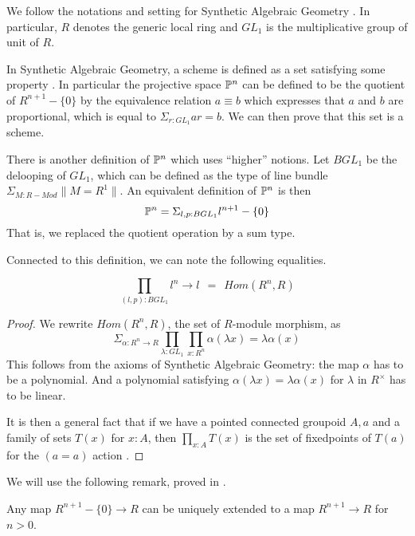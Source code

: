 We follow the notations and setting for Synthetic Algebraic Geometry \cite{draft}.
In particular, $R$ denotes the generic
local ring and $GL_1$ is the multiplicative group of unit of $R$.

In Synthetic Algebraic Geometry, a scheme is defined as a set satisfying some property \cite{draft}. In particular
the projective space $\mathbb{P}^n$ can be defined to be the quotient of $R^{n+1}-\{0\}$ by the
equivalence relation $a\equiv b$ which expresses that $a$ and $b$ are proportional, %
which is equal to $\Sigma_{r:GL_1}ar = b$. We can then prove \cite{draft}
that this set is a scheme.

There is another definition of $\mathbb{P}^n$ which uses ``higher'' notions. Let $BGL_1$ be the delooping
of $GL_1$, which can be defined as the type of line bundle $\Sigma_{M:R-Mod}\|{M=R^1}\|$.
An equivalent definition of $\mathbb{P}^n$ is then \cite{Sym}
$$
\mathbb{P}^n = \Sigma_{l,p:BGL_1}l^{n+1}-\{0\}
$$
That is, we replaced the quotient operation by a sum type.

\medskip

Connected to this definition, we can note the following equalities.

\begin{proposition}\label{end}
  $$\prod_{(l,p):BGL_1}l^n\rightarrow l ~~=~~ Hom(R^n,R)$$
\end{proposition}

\begin{proof}
We rewrite $Hom(R^n,R)$, the set of $R$-module morphism, as
$$
\Sigma_{\alpha:R^n\rightarrow R}\prod_{\lambda:GL_1}\prod_{x:R^n}\alpha(\lambda x) = \lambda \alpha(x)
$$
This follows from the axioms of Synthetic Algebraic Geometry: the map $\alpha$ has to be a polynomial. And a polynomial
satisfying $\alpha(\lambda x) = \lambda \alpha(x)$ for $\lambda$ in $R^{\times}$ has to be linear.

\medskip

It is then a general fact that if we have a pointed connected groupoid $A,a$ and a family of
sets $T(x)$ for $x:A$, then $\prod_{x:A}T(x)$ is the set of fixedpoints of $T(a)$ for the $(a=a)$ action
\cite{Sym}.
\end{proof}

We will use the following remark, proved in \cite{draft}.

\begin{lemma}\label{ext}
  Any map $R^{n+1}-\{0\}\rightarrow R$ can be uniquely extended to a map $R^{n+1}\rightarrow R$ for $n>0$.
\end{lemma}

